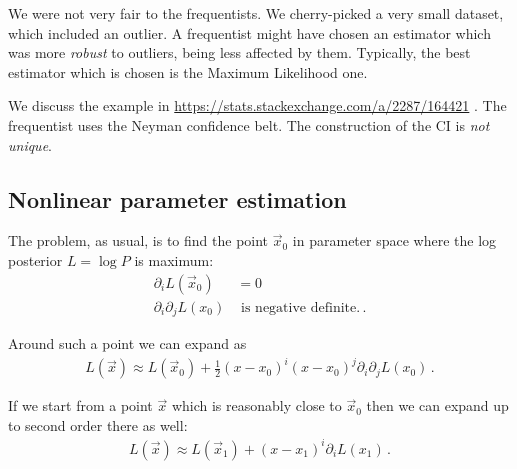 \documentclass[main.tex]{subfiles}
\begin{document}

We were not very fair to the frequentists. We cherry-picked a very small dataset, which included an outlier.
A frequentist might have chosen an estimator which was more \emph{robust} to outliers, being less affected by them. 
Typically, the best estimator which is chosen is the Maximum Likelihood one. 

We discuss the example in \url{https://stats.stackexchange.com/a/2287/164421} \cite[]{winsteinWhatDifferenceConfidence}.
The frequentist uses the Neyman confidence belt. The construction of the CI is \emph{not unique}. 

\subsection{Nonlinear parameter estimation}

The problem, as usual, is to find the point \(\vec{x}_0 \) in parameter space where the log posterior \(L = \log P\) is maximum: 
%
\begin{align}
\partial_{i} L (\vec{x}_0 ) &= 0  \\
\partial_{i} \partial_{j} L (x_0 ) & \text{ is negative definite.}
\,.
\end{align}

Around such a point we can expand as 
%
\begin{align}
L(\vec{x}) \approx L (\vec{x}_0)
+ \frac{1}{2} (x- x_0)^{i} (x-x_0 )^{j} \partial_{i} \partial_{j} L (x_0 )
\,.
\end{align}

If we start from a point \(\vec{x}\) which is reasonably close to \(\vec{x}_0\) then we can expand up to second order there as well: 
%
\begin{align}
L(\vec{x}) 
\approx L(\vec{x}_1) +
(x - x_1)^{i} \partial_{i} L(x_1) 
\,.
\end{align}
\end{document}
